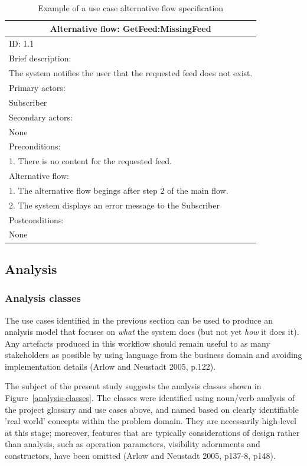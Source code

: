 \documentclass{article}
\begin{document}
\begin{table}[]
\begin{center}
\begin{tabular}{ | p{\textwidth} |}
\hline
\multicolumn{1}{|c|}{Alternative flow: GetFeed:MissingFeed} \\
\hline
ID: 1.1 \\
\hline
Brief description: \\
The system notifies the user that the requested feed does not exist. \\
\hline
Primary actors: \\
Subscriber \\
\hline
Secondary actors: \\
None \\
\hline
Preconditions: \\
1. There is no content for the requested feed. \\
\hline
Alternative flow: \\
1. The alternative flow begings after step 2 of the main flow. \\
2. The system displays an error message to the Subscriber \\
\hline
Postconditions: \\
None \\
\hline
\end{tabular}
\end{center}
\caption{Example of a use case alternative flow specification}
\label{use-case-alt-detail}
\end{table}

\subsection{Analysis}

\subsubsection{Analysis classes}

The use cases identified in the previous section can be used to produce an analysis model that focuses on \textit{what} the system does (but not yet \textit{how} it does it). Any artefacts produced in this workflow should remain useful to as many stakeholders as possible by using language from the business domain and avoiding implementation details (Arlow and Neustadt 2005, p.122).

The subject of the present study suggests the analysis classes shown in Figure~\ref{analysis-classes}. The classes were identified using noun/verb analysis of the project glossary and use cases above, and named based on clearly identifiable 'real world' concepts within the problem domain. They are necessarily high-level at this stage; moreover, features that are typically considerations of design rather than analysis, such as operation parameters, visibility adornments and constructors, have been omitted (Arlow and Neustadt 2005, p137-8, p148).
\end{document}
